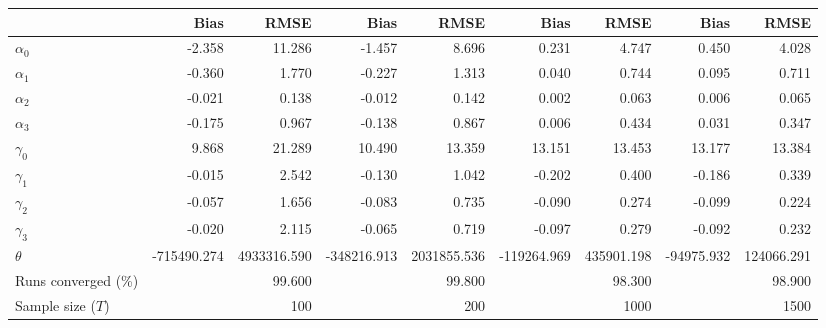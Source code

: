 
\begin{tabular}[t]{lrrrrrrrr}
\toprule
  & Bias & RMSE & Bias & RMSE & Bias & RMSE & Bias & RMSE\\
\midrule
$\alpha_{0}$ & -2.358 & 11.286 & -1.457 & 8.696 & 0.231 & 4.747 & 0.450 & 4.028\\
$\alpha_{1}$ & -0.360 & 1.770 & -0.227 & 1.313 & 0.040 & 0.744 & 0.095 & 0.711\\
$\alpha_{2}$ & -0.021 & 0.138 & -0.012 & 0.142 & 0.002 & 0.063 & 0.006 & 0.065\\
$\alpha_{3}$ & -0.175 & 0.967 & -0.138 & 0.867 & 0.006 & 0.434 & 0.031 & 0.347\\
$\gamma_{0}$ & 9.868 & 21.289 & 10.490 & 13.359 & 13.151 & 13.453 & 13.177 & 13.384\\
$\gamma_{1}$ & -0.015 & 2.542 & -0.130 & 1.042 & -0.202 & 0.400 & -0.186 & 0.339\\
$\gamma_{2}$ & -0.057 & 1.656 & -0.083 & 0.735 & -0.090 & 0.274 & -0.099 & 0.224\\
$\gamma_{3}$ & -0.020 & 2.115 & -0.065 & 0.719 & -0.097 & 0.279 & -0.092 & 0.232\\
$\theta$ & -715490.274 & 4933316.590 & -348216.913 & 2031855.536 & -119264.969 & 435901.198 & -94975.932 & 124066.291\\
Runs converged (\%) &  & 99.600 &  & 99.800 &  & 98.300 &  & 98.900\\
Sample size ($T$) &  & 100 &  & 200 &  & 1000 &  & 1500\\
\bottomrule
\end{tabular}
